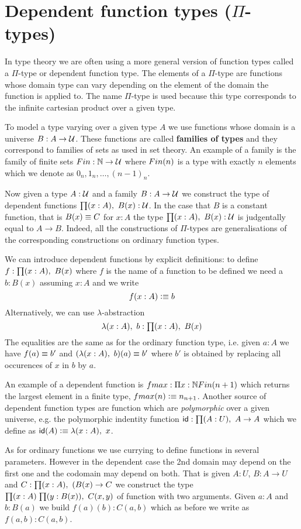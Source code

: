 \section{Dependent function types (\texorpdfstring{$\Pi$}{Π}-types)}
\label{sec:pi-types}

In type theory we are often using a more general version of function
types called a $\Pi$-type or dependent function type. The elements of
a $\Pi$-type are functions whose domain type can vary depending on the
element of the domain the function is applied to. The name $\Pi$-type
is used because this type corresponds to the infinite cartesian
product over a given type.

To model a type varying over a given type $A$ we use functions whose
domain is a universe $B : A \to \mathcal{U}$. These functions are called
\textbf{families of types} and they correspond to families of sets as used in
set theory. An example of a family is the family of finite sets $Fin
: \mathbb{N} \to \mathcal{U}$ where $Fin(n)$ is a type with exactly $n$ elements
which we denote as $0_n,1_n,\dots,(n-1)_n$. 

Now given a type $A:\mathcal{U}$ and a family $B:A \to \mathcal{U}$ we construct the
type of dependent functions $\prd{x:A}B(x) : \UU$. In the case that 
$B$ is a constant function, that is $B(x) \equiv C$ for $x:A$ the type
$\prd{x:A}B(x) : \UU$ is judgentally equal to $A \to B$. Indeed, all
the constructions of $\Pi$-types are generalisations of the
corresponding constructions on ordinary function types.

We can introduce dependent functions by explicit definitions: to
define $f : \prd{x:A}B(x)$ where $f$ is the name of a function to be
defined we need a $b : B(x)$ assuming $x:A$ and we write
\[ f(x : A) \vcentcolon\equiv b \]
Alternatively, we can use $\lambda$-abstraction 
\[ \lam{x:A} b : \prd{x:A} B(x) \]
The equalities are the same as for the ordinary function type, i.e.
given $a:A$ we have $f(a) \equiv b'$ and  
$(\lam{x:A} b)(a) \jdeq b'$ where $b' $ is obtained by replacing all
occurences of $x$ in $b$ by $a$.

An example of a dependent function is $fmax : \Pi{x:\ensuremath{\mathbb{N}}} Fin(n+1)$
which returns the largest element in a finite type, $fmax(n) \vcentcolon\equiv
n_{n+1}$. 
Another source of dependent function types
are function which are \emph{polymorphic} over a given universe,
e.g. the polymorphic indentity function $\idf : \prd{A:U} A \to A$
which we define as $\idf(A) \defeq \lam{x:A}x$.

As for ordinary functions we use currying to define functions in
several parameters. However in the dependent case the 2nd domain may
depend on the first one and the codomain may depend on both. That is
given $A:U$, $B : A \to U$ and $C : \prd{x:A}(B(x) \to C$ we construct
the type $\prd{x:A}{y : B(x)} C(x,y)$ of function with two
arguments. Given $a:A$ and $b:B(a)$ we build $f(a)(b) : C(a,b)$ which
as before we write as $f(a,b) : C(a,b)$.


